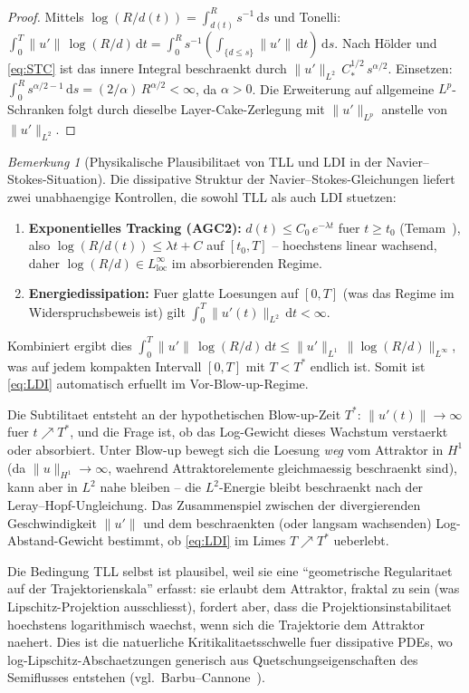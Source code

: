\documentclass[12pt,a4paper]{article}
\theoremstyle{definition}
\theoremstyle{plain}
\theoremstyle{remark}
\newtheorem{remark}[definition]{Bemerkung}
\begin{document}
\begin{proof}
Mittels $\log(R/d(t)) = \int_{d(t)}^R s^{-1}\,\mathrm{d}s$ und Tonelli:
$\int_0^T \|u'\|\,\log(R/d)\,\mathrm{d}t
= \int_0^R s^{-1}(\int_{\{d \le s\}} \|u'\|\,\mathrm{d}t)\,\mathrm{d}s$.
Nach H\"older und \eqref{eq:STC} ist das innere Integral beschraenkt durch
$\|u'\|_{L^2}\,C_*^{1/2}\,s^{\alpha/2}$. Einsetzen:
$\int_0^R s^{\alpha/2-1}\,\mathrm{d}s = (2/\alpha)\,R^{\alpha/2} < \infty$,
da $\alpha > 0$.
Die Erweiterung auf allgemeine $L^p$-Schranken folgt durch dieselbe
Layer-Cake-Zerlegung mit $\|u'\|_{L^p}$ anstelle von $\|u'\|_{L^2}$.
\end{proof}

\begin{remark}[Physikalische Plausibilitaet von TLL und LDI in der
Navier--Stokes-Situation]
\label{rem:LDI-plausibility}
Die dissipative Struktur der Navier--Stokes-Gleichungen liefert
zwei unabhaengige Kontrollen, die sowohl TLL als auch LDI stuetzen:
\begin{enumerate}[label=(\roman*)]
  \item \textbf{Exponentielles Tracking (AGC2):}\;
    $d(t) \le C_0\,e^{-\lambda t}$ fuer $t \ge t_0$
    (Temam~\cite{Temam2001}), also
    $\log(R/d(t)) \le \lambda t + C$ auf $[t_0, T]$ -- hoechstens
    linear wachsend, daher $\log(R/d) \in L^\infty_{\mathrm{loc}}$
    im absorbierenden Regime.
  \item \textbf{Energiedissipation:}\;
    Fuer glatte Loesungen auf $[0,T]$ (was das Regime im
    Widerspruchsbeweis ist) gilt
    $\int_0^T \|u'(t)\|_{L^2}\,\mathrm{d}t < \infty$.
\end{enumerate}
Kombiniert ergibt dies
$\int_0^T \|u'\|\,\log(R/d)\,\mathrm{d}t
\le \|u'\|_{L^1}\,\|\log(R/d)\|_{L^\infty}$,
was auf jedem kompakten Intervall $[0,T]$ mit
$T < T^*$ endlich ist. Somit ist \eqref{eq:LDI} automatisch erfuellt
im Vor-Blow-up-Regime.

Die Subtilitaet entsteht an der hypothetischen Blow-up-Zeit $T^*$:
$\|u'(t)\| \to \infty$ fuer $t \nearrow T^*$, und die Frage ist,
ob das Log-Gewicht dieses Wachstum verstaerkt oder absorbiert.
Unter Blow-up bewegt sich die Loesung \emph{weg} vom Attraktor
in $H^1$ (da $\|u\|_{H^1} \to \infty$, waehrend Attraktorelemente
gleichmaessig beschraenkt sind), kann aber in $L^2$ nahe bleiben -- die $L^2$-Energie bleibt beschraenkt nach der Leray--Hopf-Ungleichung. Das Zusammenspiel
zwischen der divergierenden Geschwindigkeit $\|u'\|$ und dem beschraenkten (oder langsam
wachsenden) Log-Abstand-Gewicht bestimmt, ob \eqref{eq:LDI}
im Limes $T \nearrow T^*$ ueberlebt.

Die Bedingung TLL selbst ist plausibel, weil sie eine
``geometrische Regularitaet auf der Trajektorienskala'' erfasst: sie erlaubt dem
Attraktor, fraktal zu sein (was Lipschitz-Projektion ausschliesst), fordert aber,
dass die Projektionsinstabilitaet hoechstens logarithmisch waechst,
wenn sich die Trajektorie dem Attraktor naehert.
Dies ist die natuerliche Kritikalitaetsschwelle fuer dissipative PDEs,
wo log-Lipschitz-Abschaetzungen generisch aus Quetschungseigenschaften des Semiflusses
entstehen (vgl.\ Barbu--Cannone~\cite{BarbuCannone2016}).
\end{remark}
\end{document}
